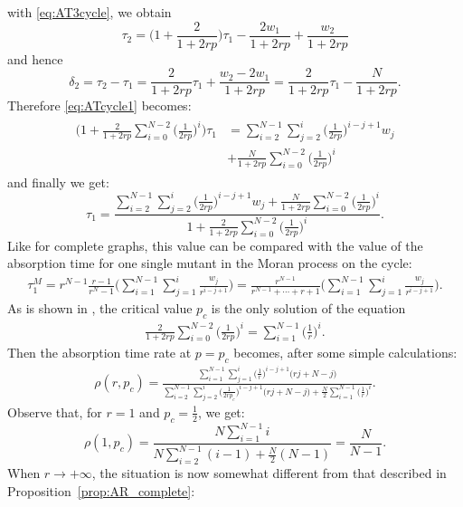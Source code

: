 \documentclass[a4paper,english,10pt]{amsart}
\theoremstyle{definition}
\numberwithin{equation}{section}
\begin{document}
\noindent
with \eqref{eq:AT3cycle}, we obtain 
$$
\tau_2 = \Big( 1 + \frac{2}{1+2rp} \Big) \tau_1 - 
 \frac{2w_1}{1+2rp} + \frac{w_2}{1+2rp} 
$$
and hence 
$$
\delta_ 2 = \tau_2 - \tau_1 =\frac{2}{1+2rp} \tau_1 + \frac{w_2 - 2w_1}{1+2rp} = \frac{2}{1+2rp} \tau_1 -  \frac{N}{1+2rp}.
$$
Therefore \eqref{eq:ATcycle1} becomes:
\begin{align} \label{eq:ATcycle}
\begin{split}
 \Big(1 + \frac{2}{1+2rp}  \sum_{i=0}^{N-2} \big(\frac{1}{2rp}\big)^i \Big) \tau_1 & =   \sum_{i=2}^{N-1} \sum_{j=2}^i \big(\frac{1}{2rp}\big)^{i-j+1}w_j \\
& + \frac{N}{1+2rp} \sum_{i=0}^{N-2} \big(\frac{1}{2rp}\big)^i  
\end{split}
\end{align}
and finally we get: 
\begin{equation} \label{eq:ATCycle}
 \tau_1 =  \frac{\displaystyle \sum_{i=2}^{N-1} \sum_{j=2}^i \big(\frac{1}{2rp}\big)^{i-j+1}w_j + \frac{N}{1+2rp} \sum_{i=0}^{N-2} \big(\frac{1}{2rp}\big)^i}{\displaystyle 1 + \frac{2}{1+2rp}  \sum_{i=0}^{N-2} \big(\frac{1}{2rp}\big)^i}.
\end{equation}
Like for complete graphs, this value can be compared with the value of the absorption time for one single mutant in the Moran process on the cycle: 
\begin{align} \label{eq:ATMorancycle}
 \tau_1^M  =  r^{N-1} \frac{\displaystyle r -1}{\displaystyle r^N - 1}  
\Big( \sum_{i=1}^{N-1} \sum_{j=1}^i \frac{w_j}{r^{i-j+1}} \Big)   = 
\frac{\displaystyle r^{N-1}}{r^{N-1} + \cdots + r + 1} \Big( \sum_{i=1}^{N-1} \sum_{j=1}^i \frac{w_j}{r^{i-j+1}} \Big). 
\end{align}
As is shown in \cite{AlcaldeGuerberoffLozano2022}, the critical value $p_c$ is the only solution of the equation
\begin{align} 
\frac{2}{1+2rp} \sum_{i=0}^{N-2} \big(\frac{1}{2rp}\big)^i = \sum_{i=1}^{N-1} \big( \frac{1}{r} \big)^i.
\end{align}
Then the absorption time rate at $p=p_c$ becomes, after some simple calculations:
\begin{align} \label{eq:CriticalAb}
\rho(r,p_c) = \frac{\displaystyle \sum_{i=1}^{N-1} \sum_{j=1}^i \big(\frac{1}{r}\big)^{i-j+1}\big(rj + N-j \big)}{\displaystyle \sum_{i=2}^{N-1} \sum_{j=2}^i \big(\frac{1}{2rp_c}\big)^{i-j+1}\big(rj + N-j \big) + \frac{N}{2} \sum_{i=1}^{N-1} \big(\frac{1}{r}\big)^i}.
\end{align}
Observe that, for $r=1$ and $p_c=\frac{1}{2}$, we get:
\[
\rho(1,p_c) = \frac{N \sum_{i=1}^{N-1} i}{N \sum_{i=2}^{N-1}(i-1) + \frac{N}{2} (N-1)} = \frac{N}{N-1}.
\]
When $r \rightarrow + \infty$, 
the situation is now somewhat different from that described in Proposition~\ref{prop:AR_complete}: 
\end{document}

